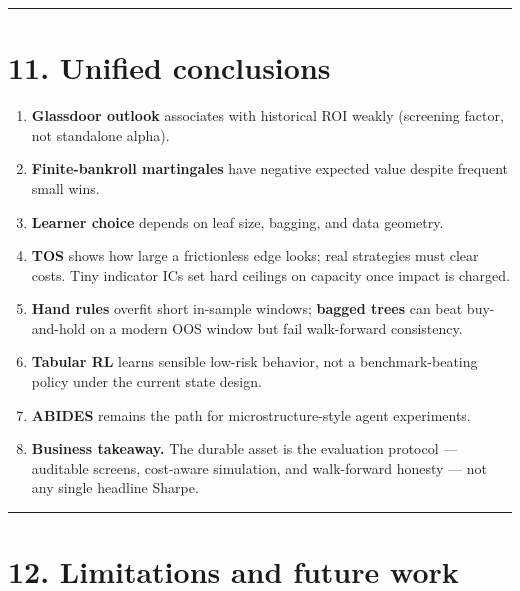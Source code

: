 \documentclass[
  11pt,
]{article}
\providecommand{\tightlist}{%
  \setlength{\itemsep}{0pt}\setlength{\parskip}{0pt}}
\begin{document}
\begin{center}\rule{0.5\linewidth}{0.5pt}\end{center}

\section{11. Unified conclusions}\label{unified-conclusions}

\begin{enumerate}
\def\labelenumi{\arabic{enumi}.}
\tightlist
\item
  \textbf{Glassdoor outlook} associates with historical ROI weakly
  (screening factor, not standalone alpha).\\
\item
  \textbf{Finite-bankroll martingales} have negative expected value
  despite frequent small wins.\\
\item
  \textbf{Learner choice} depends on leaf size, bagging, and data
  geometry.\\
\item
  \textbf{TOS} shows how large a frictionless edge looks; real
  strategies must clear costs. Tiny indicator ICs set hard ceilings on
  capacity once impact is charged.\\
\item
  \textbf{Hand rules} overfit short in-sample windows; \textbf{bagged
  trees} can beat buy-and-hold on a modern OOS window but fail
  walk-forward consistency.\\
\item
  \textbf{Tabular RL} learns sensible low-risk behavior, not a
  benchmark-beating policy under the current state design.\\
\item
  \textbf{ABIDES} remains the path for microstructure-style agent
  experiments.\\
\item
  \textbf{Business takeaway.} The durable asset is the evaluation
  protocol --- auditable screens, cost-aware simulation, and
  walk-forward honesty --- not any single headline Sharpe.
\end{enumerate}

\begin{center}\rule{0.5\linewidth}{0.5pt}\end{center}

\section{12. Limitations and future
work}\label{limitations-and-future-work}
\end{document}
